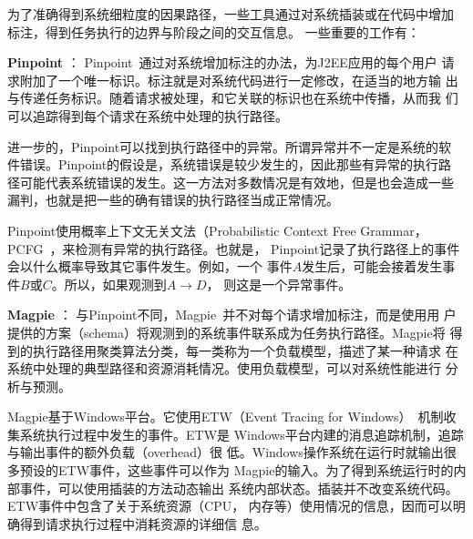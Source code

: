 为了准确得到系统细粒度的因果路径，一些工具通过对系统插装或在代码中增加
标注，得到任务执行的边界与阶段之间的交互信息。
一些重要的工作有：

% 
% 
% 
% 
% 


\textbf{Pinpoint} ：
Pinpoint~\cite{pinpoint}通过对系统增加标注的办法，为J2EE应用的每个用户
请求附加了一个唯一标识。标注就是对系统代码进行一定修改，在适当的地方输
出与传递任务标识。随着请求被处理，和它关联的标识也在系统中传播，从而我
们可以追踪得到每个请求在系统中处理的执行路径。

进一步的，Pinpoint可以找到执行路径中的异常。所谓异常并不一定是系统的软
件错误。Pinpoint的假设是，系统错误是较少发生的，因此那些有异常的执行路
径可能代表系统错误的发生。这一方法对多数情况是有效地，但是也会造成一些
漏判，也就是把一些的确有错误的执行路径当成正常情况。

Pinpoint使用概率上下文无关文法（Probabilistic Context Free
Grammar，PCFG~\cite{Manning1999}，来检测有异常的执行路径。也就是，
Pinpoint记录了执行路径上的事件会以什么概率导致其它事件发生。例如，一个
事件$A$发生后，可能会接着发生事件$B$或$C$。所以，如果观测到$A \to D$，
则这是一个异常事件。

\textbf{Magpie} ：
与Pinpoint不同，Magpie~\cite{magpie}并不对每个请求增加标注，而是使用用
户提供的方案（schema）将观测到的系统事件联系成为任务执行路径。Magpie将
得到的执行路径用聚类算法分类，每一类称为一个负载模型，描述了某一种请求
在系统中处理的典型路径和资源消耗情况。使用负载模型，可以对系统性能进行
分析与预测。

Magpie基于Windows平台。它使用ETW（Event Tracing for
Windows）~\cite{etw, Park2003}机制收集系统执行过程中发生的事件。ETW是
Windows平台内建的消息追踪机制，追踪与输出事件的额外负载（overhead）很
低。Windows操作系统在运行时就输出很多预设的ETW事件，这些事件可以作为
Magpie的输入。为了得到系统运行时的内部事件，可以使用插装的方法动态输出
系统内部状态。插装并不改变系统代码。ETW事件中包含了关于系统资源（CPU，
内存等）使用情况的信息，因而可以明确得到请求执行过程中消耗资源的详细信
息。


